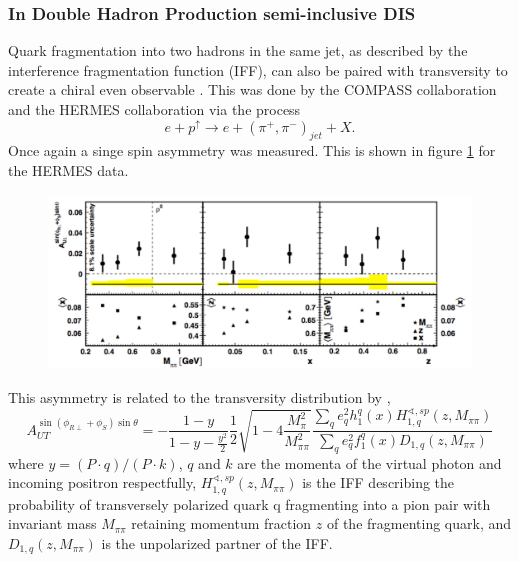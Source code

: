 \documentclass[abstract = on,listof=totoc, bibliography=totoc]{scrreprt}
\begin{document}
\subsubsection{In Double Hadron Production semi-inclusive DIS}
Quark fragmentation into two hadrons in the same jet, as described by the interference fragmentation function (IFF), can also be paired with transversity to create a chiral even observable \cite{EFREMOV1992394, Bianconi:1999cd}. This was done by the COMPASS collaboration \cite{compassRes} and the HERMES collaboration \cite{hermesRes} via the process
 \begin{equation}
e+p^\uparrow \rightarrow e + (\pi^+,\pi^-)_{jet} + X.
\end{equation}
Once again a singe spin asymmetry was measured. This is shown in figure \ref{fig:hermesAsym} for the HERMES data.
 \begin{figure}
\begin{center}
\includegraphics[width = 1\textwidth]{hermesAsym}
\caption[]{}
\label{fig:hermesAsym}
\end{center}
\end{figure}
This asymmetry is related to the transversity distribution by \cite{hermesRes},
 \begin{equation}
A_{UT}^{\sin(\phi_{R\perp}+\phi_S)\sin\theta} = - \frac{1-y}{1-y-\frac{y^2}{2}}\frac{1}{2}\sqrt{1-4\frac{M_\pi^2}{M_{\pi\pi}^2}}\frac{\sum\limits_q e_q^2h_1^q(x)H_{1,q}^{\sphericalangle,sp}(z,M_{\pi\pi})}{\sum\limits_q e_q^2f_1^q(x)D_{1,q}(z,M_{\pi\pi})}
\end{equation}
where $y = (P\cdot q)/(P\cdot k)$, $q$ and $k$ are the momenta of the virtual photon and incoming positron respectfully, $H_{1,q}^{\sphericalangle,sp}(z,M_{\pi\pi})$ is the IFF describing the probability of transversely polarized quark q fragmenting into a pion pair with invariant mass $M_{\pi\pi}$ retaining momentum fraction $z$ of the fragmenting quark, and $D_{1,q}(z,M_{\pi\pi})$ is the unpolarized partner of the IFF. 
\end{document}
